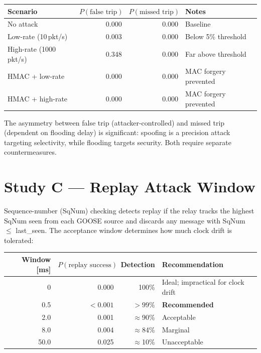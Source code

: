 \documentclass[11pt,a4paper]{article}
\begin{document}
\begin{center}
\begin{tabular}{@{}lrrl@{}}
\toprule
Scenario & $P(\text{false trip})$ & $P(\text{missed trip})$ & Notes \\
\midrule
No attack & 0.000 & 0.000 & Baseline \\
Low-rate (10\,pkt/s) & 0.003 & 0.000 & Below 5\% threshold \\
High-rate (1000\,pkt/s) & 0.348 & 0.000 & Far above threshold \\
HMAC + low-rate & 0.000 & 0.000 & MAC forgery prevented \\
HMAC + high-rate & 0.000 & 0.000 & MAC forgery prevented \\
\bottomrule
\end{tabular}
\end{center}

\medskip\noindent
The asymmetry between false trip (attacker-controlled) and missed trip
(dependent on flooding delay) is significant: spoofing is a precision
attack targeting selectivity, while flooding targets security.  Both
require separate countermeasures.

\section{Study C --- Replay Attack Window}
\label{sec:studyC}

Sequence-number (SqNum) checking detects replay if the relay tracks the
highest SqNum seen from each GOOSE source and discards any message with
SqNum $\leq$ last\_seen.  The acceptance window determines how much clock
drift is tolerated:

\begin{center}
\begin{tabular}{@{}rrrl@{}}
\toprule
Window [ms] & $P(\text{replay success})$ & Detection & Recommendation \\
\midrule
0 & 0.000 & 100\% & Ideal; impractical for clock drift \\
0.5 & $<0.001$ & $>99\%$ & \textbf{Recommended} \\
2.0 & 0.001 & $\approx$90\% & Acceptable \\
8.0 & 0.004 & $\approx$84\% & Marginal \\
50.0 & 0.025 & $\approx$10\% & Unacceptable \\
\bottomrule
\end{tabular}
\end{center}
\end{document}

